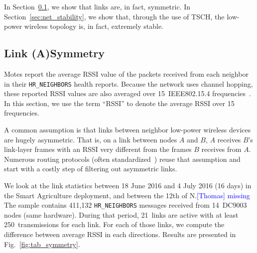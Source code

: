 \documentclass{elsarticle}
\newcommand{\thomas}[1]      {\textcolor{blue}{[Thomas] #1}}
\newcommand{\agri}                {Smart Agriculture\xspace}
\newcommand{\HRNEIGHBORS}         {{\tt HR\_NEIGHBORS}\xspace}
\begin{document}
In Section~\ref{sec:symmetry}, we show that links are, in fact, symmetric.
In Section~\ref{sec:net_stability}, we show that, through the use of TSCH, the low-power wireless topology is, in fact, extremely stable.

\subsection{Link (A)Symmetry}
\label{sec:symmetry}


Motes report the average RSSI value of the packets received from each neighbor in their \HRNEIGHBORS health reports.
Because the network uses channel hopping, these reported RSSI values are also averaged over 15~IEEE802.15.4 frequencies~\cite{std_ieee802154_2011}.
In this section, we use the term ``RSSI'' to denote the average RSSI over 15 frequencies.


A common assumption is that links between neighbor low-power wireless devices are hugely asymmetric.
That is, on a link between nodes $A$ and $B$, $A$ receives $B$'s link-layer frames with an RSSI very different from the frames $B$ receives from $A$.
Numerous routing protocols (often standardized~\cite{rfc3626}) reuse that assumption and start with a costly step of filtering out asymmetric links.


We look at the link statistics between 18 June 2016 and 4 July 2016 (16 days) in the \agri deployment, and between the 12th of N.\thomas{missing}
The sample contains 411,132 \HRNEIGHBORS messages received from 14~DC9003 nodes (same hardware).
During that period, 21~links are active with at least 250~transmissions for each link.
For each of those links, we compute the difference between average RSSI in each directions.
Results are presented in Fig.~\ref{fig:tab_symmetry}.
\end{document}
